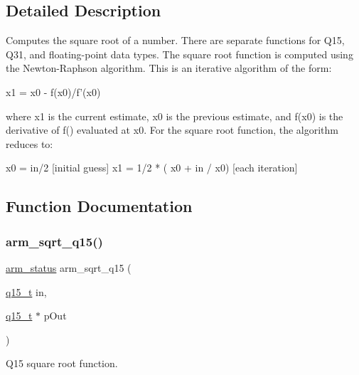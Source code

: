 \subsection{Detailed Description}
Computes the square root of a number. There are separate functions for Q15, Q31, and floating-\/point data types. The square root function is computed using the Newton-\/\+Raphson algorithm. This is an iterative algorithm of the form\+: 
\begin{DoxyPre}
     x1 = x0 - f(x0)/f'(x0)
\end{DoxyPre}
 where {\ttfamily x1} is the current estimate, {\ttfamily x0} is the previous estimate, and {\ttfamily f\textquotesingle{}(x0)} is the derivative of {\ttfamily f()} evaluated at {\ttfamily x0}. For the square root function, the algorithm reduces to\+: 
\begin{DoxyPre}
    x0 = in/2                         [initial guess]
    x1 = 1/2 * ( x0 + in / x0)        [each iteration]
\end{DoxyPre}
 

\subsection{Function Documentation}
\mbox{\label{group___s_q_r_t_ga5abe5ca724f3e15849662b03752c1238}} 
\subsubsection{\texorpdfstring{arm\+\_\+sqrt\+\_\+q15()}{arm\_sqrt\_q15()}}
{\footnotesize\ttfamily \hyperlink{arm__math_8h_a5e459c6409dfcd2927bb8a57491d7cf6}{arm\+\_\+status} arm\+\_\+sqrt\+\_\+q15 (\begin{DoxyParamCaption}\item[{\hyperlink{arm__math_8h_ab5a8fb21a5b3b983d5f54f31614052ea}{q15\+\_\+t}}]{in,  }\item[{\hyperlink{arm__math_8h_ab5a8fb21a5b3b983d5f54f31614052ea}{q15\+\_\+t} $\ast$}]{p\+Out }\end{DoxyParamCaption})}



Q15 square root function. 


